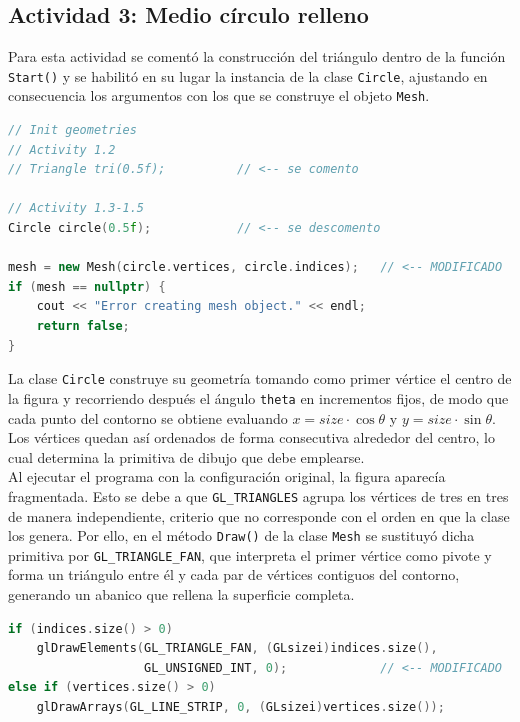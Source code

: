 \subsection{Actividad 3: Medio círculo relleno}

Para esta actividad se comentó la construcción del triángulo dentro de la función \texttt{Start()} y se habilitó en su lugar la instancia de la clase \texttt{Circle}, ajustando en consecuencia los argumentos con los que se construye el objeto \texttt{Mesh}.\\

\begin{lstlisting}[language=C++, caption={Inicialización de la geometría en la función Start().}]
// Init geometries
// Activity 1.2
// Triangle tri(0.5f);          // <-- se comento

// Activity 1.3-1.5
Circle circle(0.5f);            // <-- se descomento

mesh = new Mesh(circle.vertices, circle.indices);   // <-- MODIFICADO
if (mesh == nullptr) {
    cout << "Error creating mesh object." << endl;
    return false;
}
\end{lstlisting}

La clase \texttt{Circle} construye su geometría tomando como primer vértice el centro de la figura y recorriendo después el ángulo \texttt{theta} en incrementos fijos, de modo que cada punto del contorno se obtiene evaluando $x = size \cdot \cos\theta$ y $y = size \cdot \sin\theta$. Los vértices quedan así ordenados de forma consecutiva alrededor del centro, lo cual determina la primitiva de dibujo que debe emplearse.\\

Al ejecutar el programa con la configuración original, la figura aparecía fragmentada. Esto se debe a que \texttt{GL\_TRIANGLES} agrupa los vértices de tres en tres de manera independiente, criterio que no corresponde con el orden en que la clase los genera. Por ello, en el método \texttt{Draw()} de la clase \texttt{Mesh} se sustituyó dicha primitiva por \texttt{GL\_TRIANGLE\_FAN}, que interpreta el primer vértice como pivote y forma un triángulo entre él y cada par de vértices contiguos del contorno, generando un abanico que rellena la superficie completa.\\

\begin{lstlisting}[language=C++, caption={Cambio de primitiva de dibujo en el metodo Draw() de la clase Mesh.}]
if (indices.size() > 0)
    glDrawElements(GL_TRIANGLE_FAN, (GLsizei)indices.size(),
                   GL_UNSIGNED_INT, 0);             // <-- MODIFICADO
else if (vertices.size() > 0)
    glDrawArrays(GL_LINE_STRIP, 0, (GLsizei)vertices.size());
\end{lstlisting}

